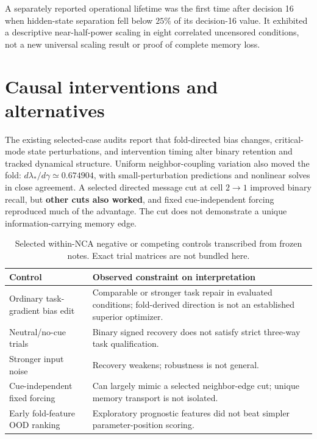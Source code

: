 \documentclass[10pt]{article}
\begin{document}
A separately reported operational lifetime was the first time after decision 16 when hidden-state separation fell below $25\%$ of its decision-16 value. It exhibited a descriptive near-half-power scaling in eight correlated uncensored conditions, not a new universal scaling result or proof of complete memory loss.

\section{Causal interventions and alternatives}
The existing selected-case audits report that fold-directed bias changes, critical-mode state perturbations, and intervention timing alter binary retention and tracked dynamical structure. Uniform neighbor-coupling variation also moved the fold: $d\lambda_*/d\gamma\simeq0.674904$, with small-perturbation predictions and nonlinear solves in close agreement. A selected directed message cut at cell $2\to1$ improved binary recall, but \textbf{other cuts also worked}, and fixed cue-independent forcing reproduced much of the advantage. The cut does not demonstrate a unique information-carrying memory edge.

\begin{table}[h]
\centering
\caption{Selected within-NCA negative or competing controls transcribed from frozen notes. Exact trial matrices are not bundled here.}
\begin{tabular}{p{}p{}}
\toprule
Control & Observed constraint on interpretation\\
\midrule
Ordinary task-gradient bias edit & Comparable or stronger task repair in evaluated conditions; fold-derived direction is not an established superior optimizer.\\
Neutral/no-cue trials & Binary signed recovery does not satisfy strict three-way task qualification.\\
Stronger input noise & Recovery weakens; robustness is not general.\\
Cue-independent fixed forcing & Can largely mimic a selected neighbor-edge cut; unique memory transport is not isolated.\\
Early fold-feature OOD ranking & Exploratory prognostic features did not beat simpler parameter-position scoring.\\
\bottomrule
\end{tabular}
\end{table}
\end{document}
